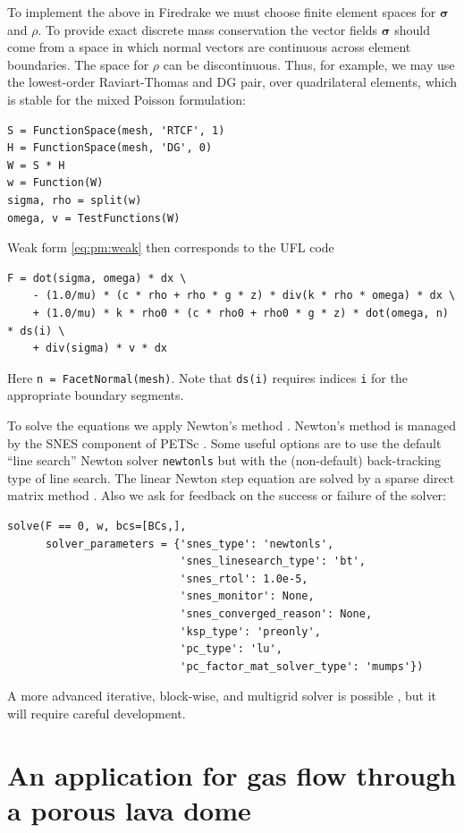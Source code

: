 \documentclass[11pt]{amsart}
\newcommand{\bsigma}{\bm{\sigma}}
\begin{document}
To implement the above in Firedrake we must choose finite element spaces for $\bsigma$ and $\rho$.  To provide exact discrete mass conservation the vector fields $\bsigma$ should come from a space in which normal vectors are continuous across element boundaries.  The space for $\rho$ can be discontinuous.  Thus, for example, we may use the lowest-order Raviart-Thomas and DG pair, over quadrilateral elements, which is stable for the mixed Poisson formulation:
\begin{Verbatim}[fontsize=\small,frame=lines]
S = FunctionSpace(mesh, 'RTCF', 1)
H = FunctionSpace(mesh, 'DG', 0)
W = S * H
w = Function(W)
sigma, rho = split(w)
omega, v = TestFunctions(W)
\end{Verbatim}
Weak form \eqref{eq:pm:weak} then corresponds to the UFL code
\begin{Verbatim}[fontsize=\small,frame=lines]
F = dot(sigma, omega) * dx \
    - (1.0/mu) * (c * rho + rho * g * z) * div(k * rho * omega) * dx \
    + (1.0/mu) * k * rho0 * (c * rho0 + rho0 * g * z) * dot(omega, n) * ds(i) \
    + div(sigma) * v * dx
\end{Verbatim}
Here \verb|n = FacetNormal(mesh)|.  Note that \verb|ds(i)| requires indices \verb|i| for the appropriate boundary segments.

To solve the equations we apply Newton's method \citep{Kelley2003}.  Newton's method is managed by the SNES component of PETSc \citep{Balay2023}.  Some useful options are to use the default ``line search'' Newton solver \texttt{newtonls} but with the (non-default) back-tracking type of line search.  The linear Newton step equation are solved by a sparse direct matrix method \citep{Amestoy2001}.  Also we ask for feedback on the success or failure of the solver:
\begin{Verbatim}[fontsize=\small,frame=lines]
solve(F == 0, w, bcs=[BCs,],
      solver_parameters = {'snes_type': 'newtonls',
                           'snes_linesearch_type': 'bt',
                           'snes_rtol': 1.0e-5,
                           'snes_monitor': None,
                           'snes_converged_reason': None,
                           'ksp_type': 'preonly',
                           'pc_type': 'lu',
                           'pc_factor_mat_solver_type': 'mumps'})
\end{Verbatim}
A more advanced iterative, block-wise, and multigrid solver is possible \citep[e.g.][]{Bueler2021}, but it will require careful development.

\section{An application for gas flow through a porous lava dome}
\end{document}
